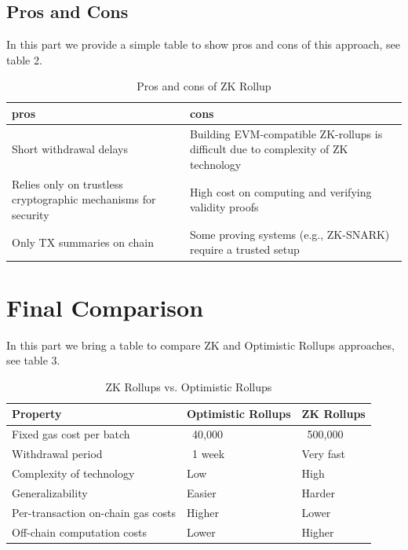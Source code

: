 \documentclass{report}
\begin{document}
\subsection{Pros and Cons}
In this part we provide a simple table to show pros and cons of this approach, see table 2.
\begin{table}[htbp]
	\centering
	\captionsetup{justification=centering}
	\caption[position=above]{Pros and cons of ZK Rollup}
	\begin{tabular}{|>{\centering\arraybackslash}p{4cm}|>{\centering\arraybackslash}p{4cm}|}
		\hline
		\textbf{pros} & \textbf{cons}\\
		\hline
		Short withdrawal delays	& Building EVM-compatible ZK-rollups is difficult due to complexity of ZK technology \\
		\hline
		Relies only on trustless cryptographic mechanisms for security & High cost on computing and verifying validity proofs \\
		\hline
		Only TX summaries on chain & Some proving systems (e.g., ZK-SNARK) require a trusted setup \\
		\hline
	\end{tabular}
\end{table}
\section{Final Comparison}
In this part we bring a table to compare ZK and Optimistic Rollups approaches, see table 3.
\begin{table}[htbp]
	\centering
	\captionsetup{justification=centering}
	\caption[position=above]{ZK Rollups vs. Optimistic Rollups}
	\begin{tabular}{|>{\centering\arraybackslash}p{4cm}|>{\centering\arraybackslash}p{4cm}|>{\centering\arraybackslash}p{4cm}|}
		\hline
		\textbf{Property} & \textbf{Optimistic Rollups} & \textbf{ZK Rollups}\\
		\hline
		Fixed gas cost per batch & ~40,000 & ~500,000\\
		\hline
		Withdrawal period & ~1 week & Very fast \\
		\hline
		Complexity of technology & Low & High \\
		\hline
		Generalizability & Easier & Harder \\
		\hline
		Per-transaction on-chain gas costs & Higher & Lower \\
		\hline
		Off-chain computation costs & Lower & Higher \\
		\hline
	\end{tabular}
\end{table}
\end{document}
